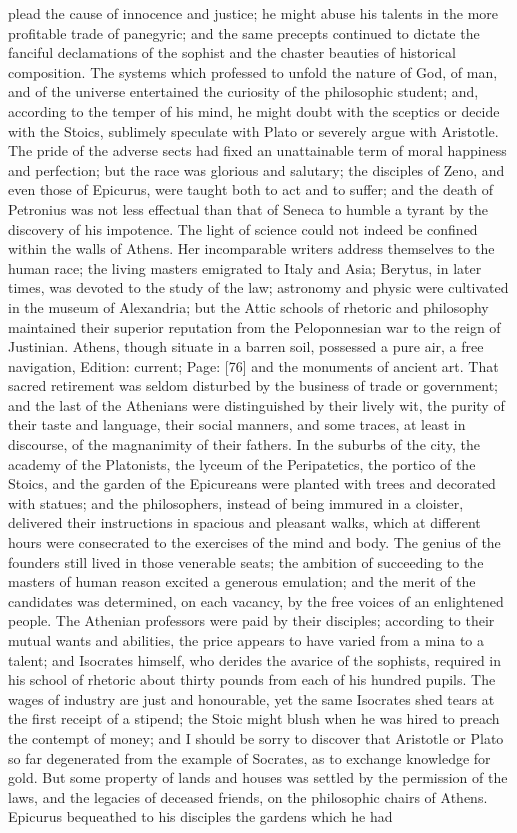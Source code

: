 plead the cause of innocence and justice; he might abuse his talents in the more profitable trade of panegyric; and the same precepts continued to dictate the fanciful declamations of the sophist and the chaster beauties of historical composition. The systems which professed to unfold the nature of God, of man, and of the universe entertained the curiosity of the philosophic student; and, according to the temper of his mind, he might doubt with the sceptics or decide with the Stoics, sublimely speculate with Plato or severely argue with Aristotle. The pride of the adverse sects had fixed an unattainable term of moral happiness and perfection; but the race was glorious and salutary; the disciples of Zeno, and even those of Epicurus, were taught both to act and to suffer; and the death of Petronius was not less effectual than that of Seneca to humble a tyrant by the discovery of his impotence. The light of science could not indeed be confined within the walls of Athens. Her incomparable writers address themselves to the human race; the living masters emigrated to Italy and Asia; Berytus, in later times, was devoted to the study of the law; astronomy and physic were cultivated in the museum of Alexandria; but the Attic schools of rhetoric and philosophy maintained their superior reputation from the Peloponnesian war to the reign of Justinian. Athens, though situate in a barren soil, possessed a pure air, a free navigation, Edition: current; Page: [76] and the monuments of ancient art. That sacred retirement was seldom disturbed by the business of trade or government; and the last of the Athenians were distinguished by their lively wit, the purity of their taste and language, their social manners, and some traces, at least in discourse, of the magnanimity of their fathers. In the suburbs of the city, the academy of the Platonists, the lyceum of the Peripatetics, the portico of the Stoics, and the garden of the Epicureans were planted with trees and decorated with statues; and the philosophers, instead of being immured in a cloister, delivered their instructions in spacious and pleasant walks, which at different hours were consecrated to the exercises of the mind and body. The genius of the founders still lived in those venerable seats; the ambition of succeeding to the masters of human reason excited a generous emulation; and the merit of the candidates was determined, on each vacancy, by the free voices of an enlightened people. The Athenian professors were paid by their disciples; according to their mutual wants and abilities, the price appears to have varied from a mina to a talent; and Isocrates himself, who derides the avarice of the sophists, required in his school of rhetoric about thirty pounds from each of his hundred pupils. The wages of industry are just and honourable, yet the same Isocrates shed tears at the first receipt of a stipend; the Stoic might blush when he was hired to preach the contempt of money; and I should be sorry to discover that Aristotle or Plato so far degenerated from the example of Socrates, as to exchange knowledge for gold. But some property of lands and houses was settled by the permission of the laws, and the legacies of deceased friends, on the philosophic chairs of Athens. Epicurus bequeathed to his disciples the gardens which he had 